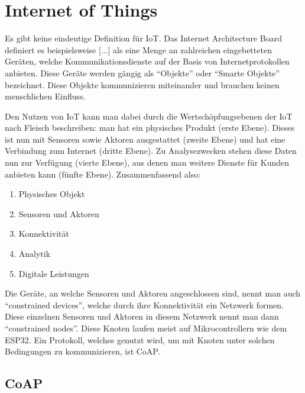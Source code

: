 \section{Internet of Things}
\label{internet-of-things-definition}

Es gibt keine eindeutige Definition für \ac{IoT}. Das Internet Architecture Board definiert es beispielsweise [...] als eine Menge an zahlreichen
eingebetteten Geräten, welche Kommunikationsdienste auf der Basis von Internetprotokollen anbieten. Diese Geräte werden gängig als ``Objekte''
oder ``Smarte Objekte'' bezeichnet. Diese Objekte kommunizieren miteinander und brauchen keinen menschlichen Einfluss. \cite{balas_internet_2019} \cite{tschofenig_architectural_2015} \cite{wendzel_it-sicherheit_2018}

\noindent Den Nutzen von IoT kann man dabei durch die Wertschöpfungsebenen der IoT nach Fleisch beschreiben: man hat ein physisches Produkt (erste Ebene). Dieses ist nun mit Sensoren sowie Aktoren ausgestattet (zweite Ebene) und
hat eine Verbindung zum Internet (dritte Ebene). Zu Analysezwecken stehen diese Daten nun zur Verfügung (vierte Ebene), aus denen man weitere Dienste für Kunden anbieten kann (fünfte Ebene). \cite{meinhardt_iot_2021}
Zusammenfassend also:

\newpage

\begin{enumerate}
    \item Physisches Objekt
    \item Sensoren und Aktoren
    \item Konnektivität
    \item Analytik
    \item Digitale Leistungen
\end{enumerate} \cite{meinhardt_iot_2021} \cite{fleisch_geschaftsmodelle_2015}

\noindent Die Geräte, an welche Sensoren und Aktoren angeschlossen sind, nennt man auch ``constrained devices'', welche durch ihre Konnektivität ein Netzwerk formen. Diese einzelnen Sensoren und Aktoren in
diesem Netzwerk nennt man dann ``constrained nodes''. \cite{bormann_terminology_2014} Diese Knoten laufen meist auf Mikrocontrollern \cite{shelby_constrained_2014} wie dem ESP32. Ein Protokoll, welches genutzt wird, um mit Knoten 
unter solchen Bedingungen zu kommunizieren, ist CoAP. \cite{bormann_terminology_2014} \cite{shelby_constrained_2014}


\subsection{CoAP}
\label{coap-definition}

